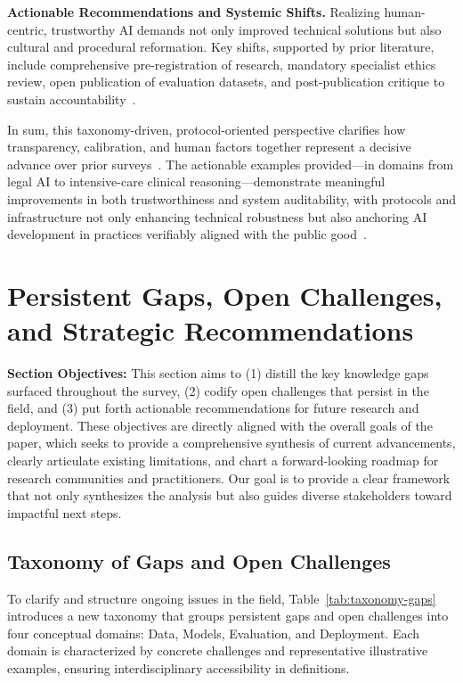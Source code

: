 \documentclass[sigconf]{acmart}
\begin{document}
\vspace{0.5em}
\textbf{Actionable Recommendations and Systemic Shifts.} Realizing human-centric, trustworthy AI demands not only improved technical solutions but also cultural and procedural reformation. Key shifts, supported by prior literature, include comprehensive pre-registration of research, mandatory specialist ethics review, open publication of evaluation datasets, and post-publication critique to sustain accountability~\cite{ref40,ref53,ref52}. 

\vspace{0.5em}
\noindent In sum, this taxonomy-driven, protocol-oriented perspective clarifies how transparency, calibration, and human factors together represent a decisive advance over prior surveys~\cite{ref52,ref55}. The actionable examples provided—in domains from legal AI to intensive-care clinical reasoning—demonstrate meaningful improvements in both trustworthiness and system auditability, with protocols and infrastructure not only enhancing technical robustness but also anchoring AI development in practices verifiably aligned with the public good~\cite{ref23,ref53,ref54,ref55}.

\section{Persistent Gaps, Open Challenges, and Strategic Recommendations}

\vspace{0.5em}
\textbf{Section Objectives:} This section aims to (1) distill the key knowledge gaps surfaced throughout the survey, (2) codify open challenges that persist in the field, and (3) put forth actionable recommendations for future research and deployment. These objectives are directly aligned with the overall goals of the paper, which seeks to provide a comprehensive synthesis of current advancements, clearly articulate existing limitations, and chart a forward-looking roadmap for research communities and practitioners. Our goal is to provide a clear framework that not only synthesizes the analysis but also guides diverse stakeholders toward impactful next steps.
\vspace{0.5em}

\subsection{Taxonomy of Gaps and Open Challenges}

To clarify and structure ongoing issues in the field, Table~\ref{tab:taxonomy-gaps} introduces a new taxonomy that groups persistent gaps and open challenges into four conceptual domains: Data, Models, Evaluation, and Deployment. Each domain is characterized by concrete challenges and representative illustrative examples, ensuring interdisciplinary accessibility in definitions.
\end{document}
